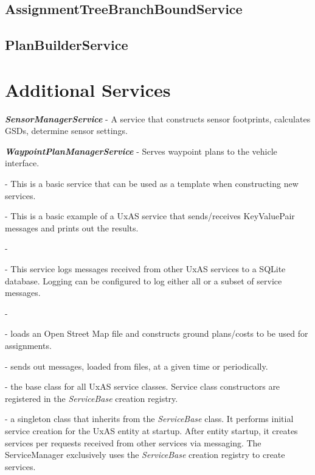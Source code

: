 \subsection{AssignmentTreeBranchBoundService}\label{assignmenttreebranchboundservice}

\subsection{PlanBuilderService}\label{planbuilderservice}


\section{Additional Services}
\begin{description}
\item
  \textbf{\textit{SensorManagerService}} - A service that constructs
  sensor footprints, calculates GSDs, determine sensor settings.
\item
  \textbf{\textit{WaypointPlanManagerService}} - Serves waypoint plans to
  the vehicle interface.
	\item[\textbf{\textit{00\_ServiceTemplate}}] - This is a basic service that can be used as a template when constructing new services.
	\item[\textbf{\textit{01\_HelloWorld}}] - This is a basic example of a UxAS service that sends/receives KeyValuePair messages and prints out the results.
	\item[\textbf{\textit{BatchSummaryService}}] - 
	\item[\textbf{\textit{MessageLoggerDataService}}] - This service logs messages received from other UxAS services to a SQLite database.  Logging can be configured to log either all or a subset of service messages.
	\item[\textbf{\textit{OperatingRegionStateService}}] - 
	\item[\textbf{\textit{OsmPlannerService}}] - loads an Open Street Map file and constructs ground plans/costs to be used for assignments.
	\item[\textbf{\textit{SendMessagesService}}] - sends out messages, loaded from files, at a given time or periodically.
	\item[\textbf{\textit{ServiceBase}}] - the base class for all UxAS service classes. Service class constructors are registered in the \textit{ServiceBase} creation registry.
	\item[\textbf{\textit{ServiceManager}}] - a singleton class that inherits from the  \textit{ServiceBase}  class. It performs initial service creation for the UxAS entity at startup. After entity startup, it creates services per requests received from other services via messaging.  The ServiceManager  exclusively uses the  \textit{ServiceBase} creation registry to create services.
\end{description}


